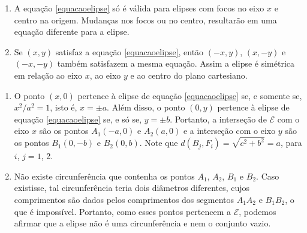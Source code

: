 \documentclass{beamer}
\begin{document}
\begin{frame}
    \begin{observacao}
        \begin{enumerate}[label=({\arabic*})]
            \item A equação \eqref{equacaoelipse} só é válida para elipses com focos no eixo $x$ e centro na origem. \pause Mudanças nos focos ou no centro,
                  \pause resultarão em uma equação diferente para a elipse.\pause

            \item Se $(x,y)$ satisfaz a equação \eqref{equacaoelipse}, \pause então $(-x,y)$\pause, $(x,-y)$ e \pause $(-x,-y)$ \pause também satisfazem a
                  mesma equação. \pause Assim a elipse é simétrica em relação ao eixo $x$, \pause ao eixo $y$ \pause e ao centro do plano cartesiano.
                  \seti
        \end{enumerate}
    \end{observacao}
\end{frame}
\begin{frame}
    \begin{observacao}
        \begin{enumerate}[label=({\arabic*})]
            \conti
            \item O ponto $(x,0)$ pertence à elipse de equação \eqref{equacaoelipse} \pause se, e somente se, \pause $x^2/a^2 = 1$, \pause isto é, $x = \pm a$.
                  \pause Além disso, o ponto $(0,y)$ pertence à elipse de equação \eqref{equacaoelipse} \pause se, e só se, $y = \pm b$. \pause Portanto, a
                  interseção de $\mathcal{E}$ com o eixo $x$ \pause são os pontos $A_1(-a,0)$ e $A_2(a,0)$ \pause e a interseção com o eixo $y$ \pause são os
                  pontos $B_1(0,-b)$ e $B_2(0,b)$. \pause Note que $d(B_j,F_i) = \sqrt{c^2 + b^2} = a$, \pause para $i$, $j = 1$, 2.\pause

            \item Não existe circunferência que contenha os pontos $A_1$, $A_2$, \pause $B_1$ e $B_2$. \pause Caso existisse, \pause tal circunferência teria
                  dois diâmetros diferentes, \pause cujos comprimentos são dados pelos comprimentos dos segmentos $A_1A_2$ \pause e $B_1B_2$, \pause o que é
                  impossível. \pause Portanto, como esses pontos pertencem a $\mathcal{E}$, \pause podemos afirmar que a elipse não é uma circunferência \pause
                  e nem o conjunto vazio.
        \end{enumerate}
    \end{observacao}
\end{frame}
\end{document}
